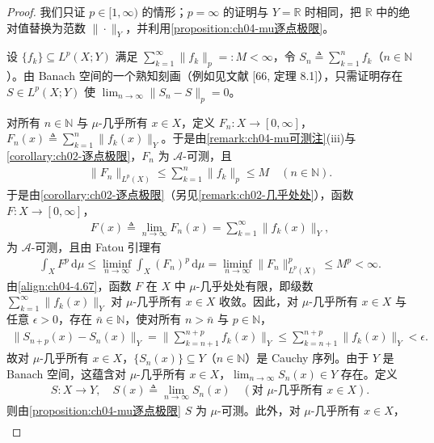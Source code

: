 \documentclass[../../main.tex]{subfiles}%
\begin{document}
\begin{proof}
我们只证 $p\in[1,\infty)$ 的情形；$p=\infty$ 的证明与 $Y=\mathbb{R}$ 时相同，把 $\mathbb{R}$ 中的绝对值替换为范数 $\|\cdot\|_Y$，并利用\cref{proposition:ch04-mu逐点极限}。

设 $\{f_k\}\subseteq L^p(X;Y)$ 满足 $\sum_{k=1}^\infty\|f_k\|_p=:M<\infty$，令 $S_n\triangleq \sum_{k=1}^n f_k$（$n\in\mathbb{N}$）。由 Banach 空间的一个熟知刻画（例如见文献 [66, 定理 8.1]），只需证明存在 $S\in L^p(X;Y)$ 使 $\lim_{n\to\infty}\|S_n-S\|_p=0$。

对所有 $n\in\mathbb{N}$ 与 $\mu$-几乎所有 $x\in X$，定义 $F_n:X\to[0,\infty]$，$F_n(x)\triangleq \sum_{k=1}^n\|f_k(x)\|_Y$。于是由\cref{remark:ch04-mu可测注}(iii)与\cref{corollary:ch02-逐点极限}，$F_n$ 为 $\mathcal{A}$-可测，且
\begin{align*}
\|F_n\|_{L^p(X)}\leqslant\sum_{k=1}^n\|f_k\|_p\leqslant M\quad(n\in\mathbb{N}).
\end{align*}
于是由\cref{corollary:ch02-逐点极限}（另见\cref{remark:ch02-几乎处处}），函数 $F:X\to[0,\infty]$，
\begin{align*}
F(x)\triangleq \lim_{n\to\infty}F_n(x)=\sum_{k=1}^\infty\|f_k(x)\|_Y,
\end{align*}
为 $\mathcal{A}$-可测，且由 Fatou 引理有
\begin{align}
\int_X F^p\,\mathrm{d}\mu\leqslant\liminf_{n\to\infty}\int_X(F_n)^p\,\mathrm{d}\mu=\liminf_{n\to\infty}\|F_n\|_{L^p(X)}^p\leqslant M^p<\infty. \label{align:ch04-4.67}
\end{align}
由\eqref{align:ch04-4.67}，函数 $F$ 在 $X$ 中 $\mu$-几乎处处有限，即级数 $\sum_{k=1}^\infty\|f_k(x)\|_Y$ 对 $\mu$-几乎所有 $x\in X$ 收敛。因此，对 $\mu$-几乎所有 $x\in X$ 与任意 $\epsilon>0$，存在 $\bar n\in\mathbb{N}$，使对所有 $n>\bar n$ 与 $p\in\mathbb{N}$，
\begin{align*}
\|S_{n+p}(x)-S_n(x)\|_Y=\Big\|\sum_{k=n+1}^{n+p}f_k(x)\Big\|_Y\leqslant\sum_{k=n+1}^{n+p}\|f_k(x)\|_Y<\epsilon.
\end{align*}
故对 $\mu$-几乎所有 $x\in X$，$\{S_n(x)\}\subseteq Y$（$n\in\mathbb{N}$）是 Cauchy 序列。由于 $Y$ 是 Banach 空间，这蕴含对 $\mu$-几乎所有 $x\in X$，$\lim_{n\to\infty}S_n(x)\in Y$ 存在。定义
\begin{align}
S:X\to Y,\quad S(x)\triangleq \lim_{n\to\infty}S_n(x)\quad(\text{对 }\mu\text{-几乎所有 }x\in X). \label{align:ch04-4.68}
\end{align}
则由\cref{proposition:ch04-mu逐点极限} $S$ 为 $\mu$-可测。此外，对 $\mu$-几乎所有 $x\in X$，
\begin{align}

\end{align}
\end{proof}
\end{document}
